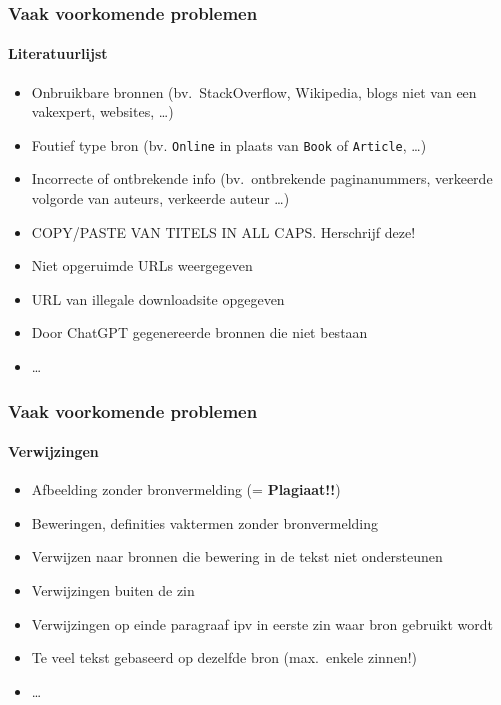 \documentclass[aspectratio=169]{beamer}
\begin{document}
\begin{frame}[plain]
  \frametitle{Vaak voorkomende problemen}
  \framesubtitle{Literatuurlijst}

  \begin{itemize}
    \item Onbruikbare bronnen (bv.\ StackOverflow, Wikipedia, blogs niet van een vakexpert, websites, \ldots)
    \item Foutief type bron (bv. \texttt{Online} in plaats van \texttt{Book} of \texttt{Article}, \ldots)
    \item Incorrecte of ontbrekende info (bv.\ ontbrekende paginanummers, verkeerde volgorde van auteurs, verkeerde auteur \ldots)
    \item COPY/PASTE VAN TITELS IN ALL CAPS. Herschrijf deze!
    \item Niet opgeruimde URLs weergegeven
    \item URL van illegale downloadsite opgegeven
    \item Door ChatGPT gegenereerde bronnen die niet bestaan
    \item \ldots
  \end{itemize}
\end{frame}

\begin{frame}
  \frametitle{Vaak voorkomende problemen}
  \framesubtitle{Verwijzingen}

  \begin{itemize}
    \item Afbeelding zonder bronvermelding (= \textcolor{hgorange}{\textbf{Plagiaat!!}})
    \item Beweringen, definities vaktermen zonder bronvermelding
    \item Verwijzen naar bronnen die bewering in de tekst niet ondersteunen
    \item Verwijzingen buiten de zin
    \item Verwijzingen op einde paragraaf ipv in eerste zin waar bron gebruikt wordt
    \item Te veel tekst gebaseerd op dezelfde bron (max.\ enkele zinnen!)
    \item \ldots
  \end{itemize}

\end{frame}
\end{document}
